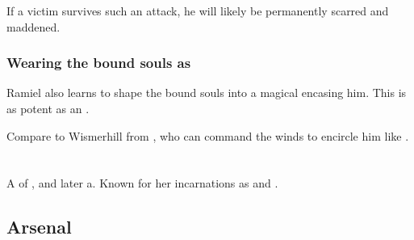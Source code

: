 If a victim survives such an attack, he will likely be permanently scarred and maddened. 






\subsubsection{Wearing the bound souls as \armour}
Ramiel also learns to shape the bound souls into a magical \armour encasing him. This is as potent as an .

Compare to Wismerhill from \FLuneNoire, who can command the winds to encircle him like \armour. 















\section[Shiaraid]{\Shiaraid}
\index{\Shiaraid}
A \sathariah{} \resvil{} of \Mystraacht, and later a\malach{}. 
Known for her incarnations as  and .








\subsection{Arsenal}





